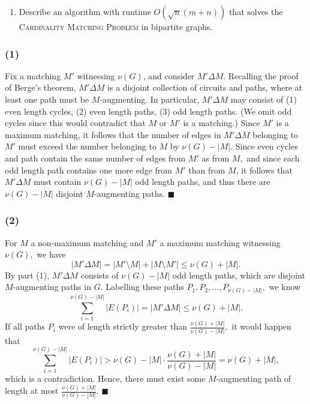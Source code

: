 \documentclass{article}
\begin{document}
\begin{centerframebox}
\begin{enumerate}[resume]
        \item Describe an algorithm with runtime $O(\sqrt{n}(m + n))$ that solves the \textsc{Cardinality Matching Problem} in bipartite graphs.
    \end{enumerate}
  \end{centerframebox}

  \subsubsection*{(1)} Fix a matching $M'$ witnessing $\nu(G)$, and consider $M'\Delta M.$ Recalling the proof of Berge's theorem, $M'\Delta M$ is a disjoint collection of circuits and paths, where at least one path must be $M$-augmenting. In particular, $M'\Delta M$ may consist of (1) even length cycles, (2) even length paths, (3) odd length paths. (We omit odd cycles since this would contradict that $M$ or $M'$ is a matching.) Since $M'$ is a maximum matching, it follows that the number of edges in $M'\Delta M$ belonging to $M'$ must exceed the number belonging to $M$ by $\nu(G)-|M|.$ Since even cycles and path contain the same number of edges from $M'$ as from $M,$ and since each odd length path contains one more edge from $M'$ than from $M$, it follows that $M'\Delta M$ must contain $\nu(G)-|M|$ odd length paths, and thus there are $\nu(G)-|M|$ disjoint $M$-augmenting paths. $\blacksquare$

  \subsubsection*{(2)} For $M$ a non-maximum matching and $M'$ a maximum matching witnessing $\nu(G),$ we have $$|M'\Delta M|=|M'\setminus M|+|M\setminus M'|\leq \nu(G)+|M|.$$ By part (1), $M'\Delta M$ consists of $\nu(G)-|M|$ odd length paths, which are disjoint $M$-augmenting paths in $G$. Labelling these paths $P_1,P_2,\dots, P_{\nu(G)-|M|},$ we know $$\sum_{i=1}^{\nu(G)-|M|} |E(P_i)| = |M'\Delta M|\leq \nu(G)+|M|.$$ If all paths $P_i$ were of length strictly greater than $\frac{\nu(G)+|M|}{\nu(G)-|M|},$ it would happen that
  $$\sum_{i=1}^{\nu(G)-|M|} |E(P_i)| > \nu(G)-|M|\cdot \frac{\nu(G)+|M|}{\nu(G)-|M|}=\nu(G)+|M|,$$which is a contradiction. Hence, there must exist some $M$-augmenting path of length at most $\frac{\nu(G)+|M|}{\nu(G)-|M|}$. $\blacksquare$
\end{document}
